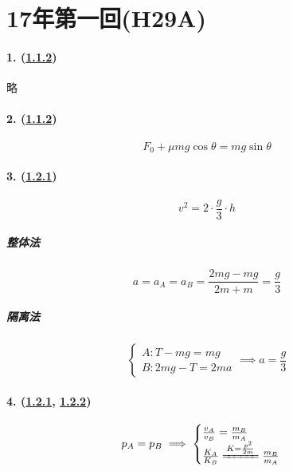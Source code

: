 
\section{17年第一回(H29A)}

\paragraph{1. (\hyperref[subsec:1.1.2]{1.1.2})} 略
\paragraph{2. (\hyperref[subsec:1.1.2]{1.1.2})}

\begin{equation*}
    F_0+\mu mg\cos\theta=mg\sin\theta
\end{equation*}

\paragraph{3. (\hyperref[subsec:1.2.1]{1.2.1})}

\begin{equation*}
    v^2=2\cdot\frac{g}{3}\cdot h
\end{equation*}

\subparagraph{整体法}

\begin{equation*}
    a=a_A=a_B=\frac{2mg-mg}{2m+m}=\frac{g}{3}
\end{equation*}

\subparagraph{隔离法}

\begin{equation*}
    \begin{cases}
        A: T-mg=mg\\
        B: 2mg-T=2ma
    \end{cases}\implies
    a=\frac{g}{3}
\end{equation*}

\paragraph{4. (\hyperref[subsec:1.2.1]{1.2.1}, \hyperref[subsec:1.2.2]{1.2.2})}

\begin{gather*}
    p_A=p_B\implies
    \begin{cases}
        \frac{v_A}{v_B}=\frac{m_B}{m_A}\\
        \frac{K_A}{K_B}\xlongequal{K=\frac{p^2}{2m}}\frac{m_B}{m_A}
    \end{cases}
\end{gather*}

